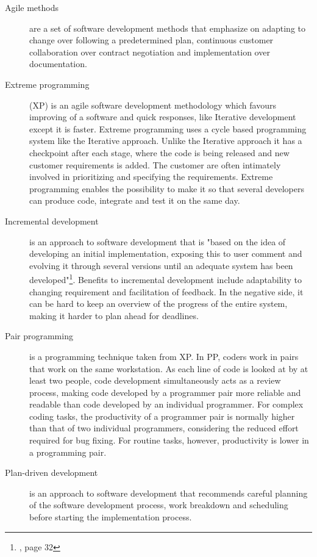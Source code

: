 \begin{description}

\item[Agile methods] \label{def:agile} are a set of software development methods that emphasize on adapting to change over following a predetermined plan, continuous customer collaboration over contract negotiation and implementation over documentation.

\item[Extreme programming] (XP) is an agile software development methodology which favours improving of a software and quick responses, like Iterative development except it is faster. Extreme programming uses a cycle based programming system like the Iterative approach. Unlike the Iterative approach it has a checkpoint after each stage, where the code is being released and new customer requirements is added. The customer are often intimately involved in prioritizing and specifying the requirements. Extreme programming enables the possibility to make it so that several developers can produce code, integrate and test it on the same day.  %

\item[Incremental development] \label{def:incrementalDev} is an approach to software development that is "based on the idea of developing an initial implementation, exposing this to user comment and evolving it through several versions until an adequate system has been developed"\footnote{\cite{sommerville}, page 32}. Benefits to incremental development include adaptability to changing requirement and facilitation of feedback. In the negative side, it can be hard to keep an overview of the progress of the entire system, making it harder to plan ahead for deadlines.

\item[Pair programming] \label{def:pairprogram} is a programming technique taken from XP. In PP, coders work in pairs that work on the same workstation. As each line of code is looked at by at least two people, code development simultaneously acts as a review process, making code developed by a programmer pair more reliable and readable than code developed by an individual programmer. For complex coding tasks, the productivity of a programmer pair is normally higher than that of two individual programmers, considering the reduced effort required for bug fixing. For routine tasks, however, productivity is lower in a programming pair.

\item[Plan-driven development] \label{def:plan-driven} is an approach to software development that recommends careful planning of the software development process, work breakdown and scheduling before starting the implementation process. 


\end{description}
